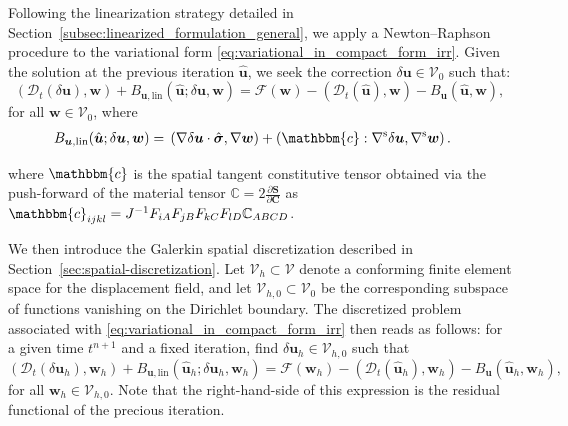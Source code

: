 \documentclass[11pt,english]{article}
\def\disp{\boldsymbol{u}}
\def\disptest{\boldsymbol{w}}
\def\stress{\boldsymbol{\sigma}}
\def\SpaceDisp{\boldsymbol{\mathcal{V}}}
\def\DerBirreducibleLIN{B_{\disp,\text{lin}}}
\def\Birreducible{B_{\disp}}
\def\disph{\disp_h}
\def\disptesth{\disptest_h}
\def\hatdisph{\hat{\disp}_h}
\begin{document}
    Following the linearization strategy detailed in Section~\ref{subsec:linearized_formulation_general}, we apply a Newton--Raphson procedure to the variational form \eqref{eq:variational_in_compact_form_irr}. Given the solution at the previous iteration $\hat{\disp}$, we seek the correction $\delta \disp \in \SpaceDisp_0$ such that:
    \begin{equation}
        \left(\mathcal{D}_t\left( \delta \disp \right),\boldsymbol{w}\right )
        + \DerBirreducibleLIN (\hat{\disp};\delta \disp,\boldsymbol{w})
        =
        \mathcal{F}\left(\boldsymbol{w}\right)
        -(\mathcal{D}_t(\hat{\disp}),\boldsymbol{w})
        -\Birreducible(\hat{\disp},\boldsymbol{w}),
        \label{eq:variational_in_compact_form_linearized_irr}
    \end{equation}
    for all $\boldsymbol{w} \in \SpaceDisp_0$, where
    \begin{align*}
        \DerBirreducibleLIN (\hat{\disp}; \delta \disp, \boldsymbol{w})
        =\;&
        \left( \nabla \delta \disp \cdot \hat{\stress}, \nabla \disptest \right)
        + \left( \mathbbm{c} : \nabla^{\rm{s}} \delta \disp, \nabla^{\rm{s}} \disptest \right).
    \end{align*}
    
    \noindent
    where $\mathbbm{c}$ is the spatial tangent constitutive tensor obtained via the push-forward of the material tensor $\mathbb{C} = 2\frac{\partial \mathbf{S}}{\partial \mathbf{C}}$ as $\mathbbm{c}_{ijkl} = J^{-1} F_{iA} F_{jB} F_{kC} F_{lD} \mathbb{C}_{ABCD}$.
    \medskip
    
    We then introduce the Galerkin spatial discretization described in Section~\ref{sec:spatial-discretization}.
    Let $\SpaceDisp_h \subset \SpaceDisp$ denote a conforming finite element space for the displacement field, and let $\SpaceDisp_{h,0} \subset \SpaceDisp_0$ be the corresponding subspace of functions vanishing on the Dirichlet boundary. 
    The discretized problem associated with \eqref{eq:variational_in_compact_form_irr} then reads as follows: for a given time $t^{n+1}$ and a fixed iteration, find $\delta \disph \in \SpaceDisp_{h,0}$ such that
    \begin{equation}
        \left(\mathcal{D}_t\left( \delta \disph \right),\disptesth\right)
        + \DerBirreducibleLIN (\hatdisph;\delta \disph,\disptesth)
        =
        \mathcal{F}\left(\disptesth\right)
        -(\mathcal{D}_t(\hatdisph),\disptesth)
        -\Birreducible(\hatdisph,\disptesth),
        \label{eq:galerkin_in_compact_form}
    \end{equation}
    for all $\disptesth \in \SpaceDisp_{h,0}$. Note that the right-hand-side of this expression is the residual functional of the precious iteration.
\end{document}
